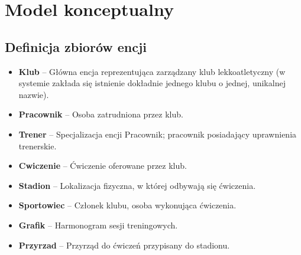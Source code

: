 \documentclass[11pt,a4paper]{article}
\begin{document}
\section{Model konceptualny}

\subsection{Definicja zbiorów encji}
\begin{itemize}
    \item \textbf{Klub} -- Główna encja reprezentująca zarządzany klub lekkoatletyczny (w systemie zakłada się istnienie dokładnie jednego klubu o jednej, unikalnej nazwie).
    \item \textbf{Pracownik} -- Osoba zatrudniona przez klub.
    \item \textbf{Trener} -- Specjalizacja encji Pracownik; pracownik posiadający uprawnienia trenerskie.
    \item \textbf{Cwiczenie} -- Ćwiczenie oferowane przez klub.
    \item \textbf{Stadion} -- Lokalizacja fizyczna, w której odbywają się ćwiczenia.
    \item \textbf{Sportowiec} -- Członek klubu, osoba wykonująca ćwiczenia.
    \item \textbf{Grafik} -- Harmonogram sesji treningowych.
    \item \textbf{Przyrzad} -- Przyrząd do ćwiczeń przypisany do stadionu.
\end{itemize}
\end{document}

